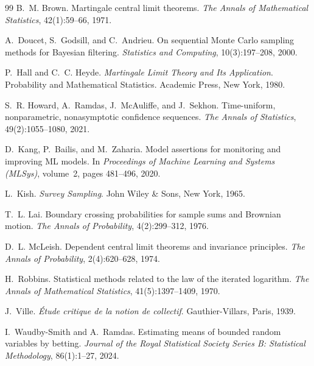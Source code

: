 \documentclass[11pt,a4paper]{article}
\begin{document}
\begin{thebibliography}{99}
B.~M. Brown.
\newblock Martingale central limit theorems.
\newblock \emph{The Annals of Mathematical Statistics}, 42(1):59--66, 1971.

A.~Doucet, S.~Godsill, and C.~Andrieu.
\newblock On sequential Monte Carlo sampling methods for Bayesian filtering.
\newblock \emph{Statistics and Computing}, 10(3):197--208, 2000.

P.~Hall and C.~C. Heyde.
\newblock \emph{Martingale Limit Theory and Its Application}.
\newblock Probability and Mathematical Statistics. Academic Press, New York, 1980.

S.~R. Howard, A.~Ramdas, J.~McAuliffe, and J.~Sekhon.
\newblock Time-uniform, nonparametric, nonasymptotic confidence sequences.
\newblock \emph{The Annals of Statistics}, 49(2):1055--1080, 2021.

D.~Kang, P.~Bailis, and M.~Zaharia.
\newblock Model assertions for monitoring and improving ML models.
\newblock In \emph{Proceedings of Machine Learning and Systems (MLSys)}, volume~2, pages 481--496, 2020.

L.~Kish.
\newblock \emph{Survey Sampling}.
\newblock John Wiley \& Sons, New York, 1965.

T.~L. Lai.
\newblock Boundary crossing probabilities for sample sums and Brownian motion.
\newblock \emph{The Annals of Probability}, 4(2):299--312, 1976.

D.~L. McLeish.
\newblock Dependent central limit theorems and invariance principles.
\newblock \emph{The Annals of Probability}, 2(4):620--628, 1974.

H.~Robbins.
\newblock Statistical methods related to the law of the iterated logarithm.
\newblock \emph{The Annals of Mathematical Statistics}, 41(5):1397--1409, 1970.

J.~Ville.
\newblock \emph{{\'E}tude critique de la notion de collectif}.
\newblock Gauthier-Villars, Paris, 1939.

I.~Waudby-Smith and A.~Ramdas.
\newblock Estimating means of bounded random variables by betting.
\newblock \emph{Journal of the Royal Statistical Society Series B: Statistical Methodology}, 86(1):1--27, 2024.
\end{thebibliography}
\end{document}

